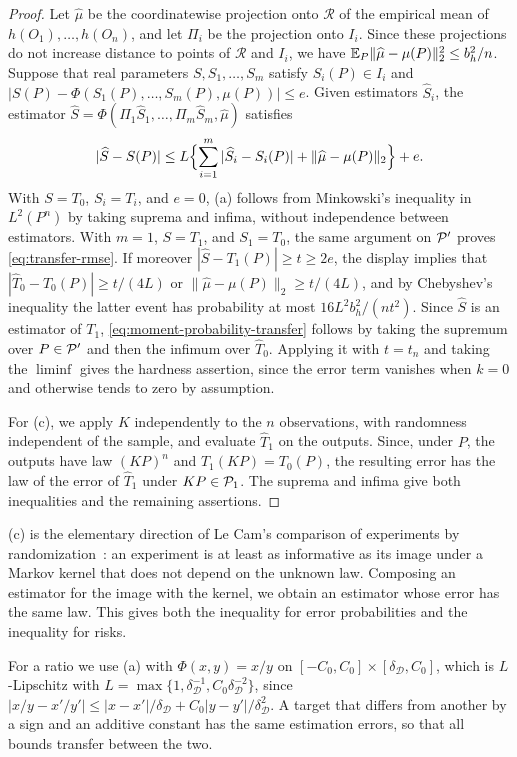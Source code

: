 \begin{proof}
Let $\widehat\mu$ be the coordinatewise projection onto $\mathcal R$ of
the empirical mean of $h(O_1),\ldots,h(O_n)$, and let $\Pi_i$ be the
projection onto $I_i$. Since these projections do not increase distance to
points of $\mathcal R$ and $I_i$, we have
$\mathbb E_P\|\widehat\mu-\mu(P)\|_2^2\le b_h^2/n$. Suppose that real
parameters $S,S_1,\ldots,S_m$ satisfy $S_i(P)\in I_i$ and
$|S(P)-\Phi(S_1(P),\ldots,S_m(P),\mu(P))|\le e$. Given estimators
$\widehat S_i$, the estimator
$\widehat S=\Phi(\Pi_1\widehat S_1,\ldots,\Pi_m\widehat S_m,\widehat\mu)$
satisfies
\[
 |\widehat S-S(P)|
 \le L\Bigl\{\sum_{i=1}^m|\widehat S_i-S_i(P)|
 +\|\widehat\mu-\mu(P)\|_2\Bigr\}+e .
\]
With $S=T_0$, $S_i=T_i$, and $e=0$, (a) follows from Minkowski's
inequality in $L^2(P^n)$ by taking suprema and infima, without
independence between estimators. With $m=1$, $S=T_1$, and $S_1=T_0$, the same argument on
$\mathcal P'$ proves \eqref{eq:transfer-rmse}. If moreover
$|\widehat S-T_1(P)|\ge t\ge2e$, the display implies that
$|\widehat T_0-T_0(P)|\ge t/(4L)$ or
$\|\widehat\mu-\mu(P)\|_2\ge t/(4L)$, and by Chebyshev's inequality the
latter event has probability at most $16L^2b_h^2/(nt^2)$. Since
$\widehat S$ is an estimator of $T_1$,
\eqref{eq:moment-probability-transfer} follows by taking the supremum
over $P\in\mathcal P'$ and then the infimum over $\widehat T_0$. Applying it
with $t=t_n$ and taking the $\liminf$ gives the hardness assertion,
since the error term
vanishes when $k=0$ and otherwise tends to zero by assumption.

For (c), we apply $K$ independently to the $n$ observations, with
randomness independent of the sample, and evaluate $\widehat T_1$ on the
outputs. Since, under $P$, the outputs have law $(KP)^n$ and
$T_1(KP)=T_0(P)$, the resulting error has the law of the error of
$\widehat T_1$ under $KP\in\mathcal P_1$. The suprema and infima give
both inequalities and the remaining assertions.
\end{proof}

(c) is the elementary direction of Le Cam's
comparison of experiments by randomization~\cite[Chapter~2]{lecam}: an
experiment is at least as informative as its image under a Markov kernel
that does not depend on the unknown law. Composing an estimator for the
image with the kernel, we obtain an estimator whose error has the same
law. This gives both the inequality for error probabilities and the
inequality for risks.

For a ratio we use (a) with $\Phi(x,y)=x/y$ on
$[-C_0,C_0]\times[\delta_{\mathcal D},C_0]$, which is $L$-Lipschitz with
$L=\max\{1,\delta_{\mathcal D}^{-1},C_0\delta_{\mathcal D}^{-2}\}$, since
$|x/y-x'/y'|\le|x-x'|/\delta_{\mathcal D}+C_0|y-y'|/\delta_{\mathcal D}^2$.
A target that differs from another by a sign and an additive constant
has the same estimation errors, so that all bounds transfer between
the two.

